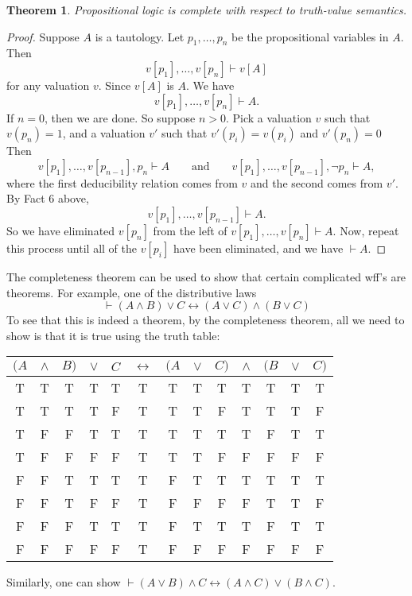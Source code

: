 \documentclass[12pt]{article}
\newtheorem{thm}{Theorem}
\begin{document}
\begin{thm} Propositional logic is complete with respect to truth-value semantics. \end{thm}
\begin{proof}  Suppose $A$ is a tautology.  Let $p_1,\ldots,p_n$ be the propositional variables in $A$.  Then $$ v[p_1],\ldots, v[p_n] \vdash v[A]$$
for any valuation $v$.  Since $v[A]$ is $A$.  We have
$$v[p_1],\ldots, v[p_n] \vdash A.$$
If $n=0$, then we are done.  So suppose $n>0$.  Pick a valuation $v$ such that $v(p_n)=1$, and a valuation $v'$ such that $v'(p_i)=v(p_i)$ and $v'(p_n)=0$  Then
$$v[p_1],\ldots, v[p_{n-1}],  p_n \vdash A \qquad \mbox{and} \qquad v[p_1],\ldots,  v[p_{n-1}], \neg p_n \vdash A,$$
where the first deducibility relation comes from $v$ and the second comes from $v'$.  By Fact 6 above,
$$v[p_1],\ldots, v[p_{n-1}] \vdash A.$$
So we have eliminated $v[p_n]$ from the left of $v[p_1],\ldots, v[p_n] \vdash A$.  Now, repeat this process until all of the $v[p_i]$ have been eliminated, and we have $\vdash A$.
\end{proof}

The completeness theorem can be used to show that certain complicated wff's are theorems.  For example, one of the  distributive laws
$$\vdash (A\land B)\lor C \leftrightarrow (A\lor C)\land (B\lor C)$$
To see that this is indeed a theorem, by the completeness theorem, all we need to show is that it is true using the truth table:
\begin{center}
\begin{tabular}{ccccccccccccc}
$(A$ & $\land$ & $B)$ & $\lor$ & $C$ & $\leftrightarrow$ & $(A$ & $\lor$ & $C)$ & $\land$ & $(B$ & $\lor$ & $C)$ \\
\hline 
T & T & T & T & T & T & T & T & T & T & T & T & T \\
T & T & T & T & F & T & T & T & F & T & T & T & F \\
T & F & F & T & T & T & T & T & T & T & F & T & T \\
T & F & F & F & F & T & T & T & F & F & F & F & F \\
F & F & T & T & T & T & F & T & T & T & T & T & T \\
F & F & T & F & F & T & F & F & F & F & T & T & F \\
F & F & F & T & T & T & F & T & T & T & F & T & T \\
F & F & F & F & F & T & F & F & F & F & F & F & F 
\end{tabular}
\end{center}
Similarly, one can show $\vdash (A\lor B)\land C \leftrightarrow (A\land C)\lor (B\land C)$.

\end{document}
